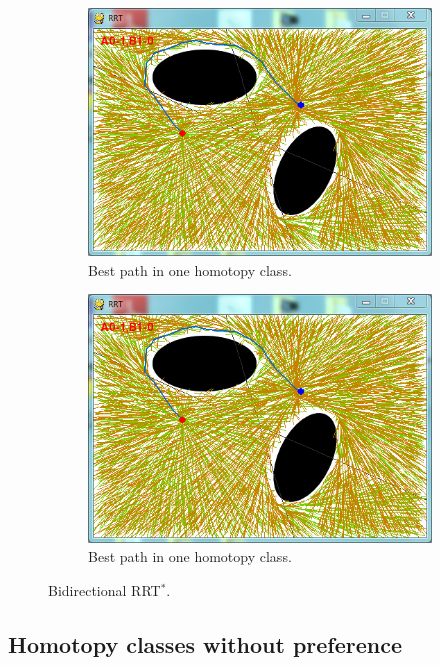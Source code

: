 \documentclass[letterpaper, 10 pt, conference]{ieeeconf}
\begin{document}
\begin{figure}
\begin{subfigure}[t]{0.47\linewidth}
		\centering
		\includegraphics[width=\textwidth]{fig/all_homotopy2.png}
		\caption{Best path in one homotopy class.}
		\label{fig:all_homotopy:03}
	\end{subfigure}  
	\begin{subfigure}[t]{0.47\linewidth}
		\centering
		\includegraphics[width=\textwidth]{fig/all_homotopy2.png}
		\caption{Best path in one homotopy class.}
		\label{fig:all_homotopy:all_scores}
	\end{subfigure}	   
	\caption{Bidirectional RRT$^{*}$.}
	\label{fig:all_homotopy:no_pref}
\end{figure}

\subsection{Homotopy classes without preference}
\end{document}
